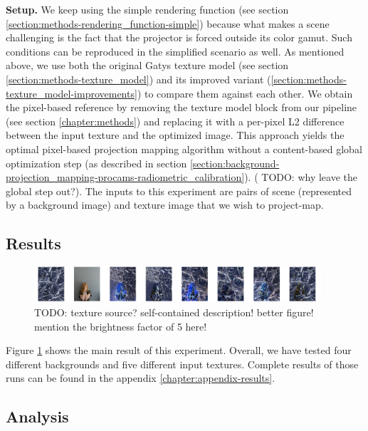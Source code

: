 \textbf{Setup.} We keep using the simple rendering function (see section \ref{section:methods-rendering_function-simple}) because what makes a scene challenging is the fact that the projector is forced outside its color gamut. Such conditions can be reproduced in the simplified scenario as well. As mentioned above, we use both the original Gatys texture model (see section \ref{section:methods-texture_model}) and its improved variant (\ref{section:methods-texture_model-improvements}) to compare them against each other. We obtain the pixel-based reference by removing the texture model block from our pipeline (see section \ref{chapter:methods}) and replacing it with a per-pixel L2 difference between the input texture and the optimized image. This approach yields the optimal pixel-based projection mapping algorithm without a content-based global optimization step (as described in section \ref{section:background-projection_mapping-procams-radiometric_calibration}). ({\color{red} TODO: why leave the global step out?}). The inputs to this experiment are pairs of scene (represented by a background image) and texture image that we wish to project-map.

\subsection{Results}
\label{section:results-experiments-02-results}

\begin{figure}[ht]
    \begin{center}
        \includegraphics[width=0.95\textwidth]{images/ex02-crop.png}
        \caption{{\color{red} TODO: texture source? self-contained description! better figure! mention the brightness factor of 5 here!}}
        \label{fig:ex02}
    \end{center}
\end{figure}

Figure \ref{fig:ex02} shows the main result of this experiment. Overall, we have tested four different backgrounds and five different input textures. Complete results of those runs can be found in the appendix \ref{chapter:appendix-results}.

\subsection{Analysis}
\label{section:results-experiments-02-analysis}

